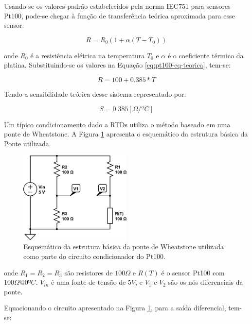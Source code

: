 \documentclass[a4paper]{instrumentacao}
\begin{document}
Usando-se os valores-padrão estabelecidos pela norma IEC751 para sensores Pt100, pode-se chegar à função de transferência teórica aproximada para esse sensor:

\begin{equation}
	R=R_0(1+\alpha(T-T_0))
	\label{eq:pt100-eq-teorica}
\end{equation}

\noindent onde $R_0$ é a resistência elétrica na temperatura $T_0$ e $\alpha$ é o coeficiente térmico da platina. Substituindo-se os valores na Equação \ref{eq:pt100-eq-teorica}, tem-se:

\begin{equation}
	R=100+0.385*T
	\label{eq:pt100-eq-teorica-valor}
\end{equation}

Tendo a sensibilidade teórica desse sistema representado por:

\begin{equation}
	S=0.385 [\Omega/ºC]
	\label{eq:pt100-sensibilidade-teorica-valor}
\end{equation}

Um típico condicionamento dado a RTDs utiliza o método baseado em uma ponte de Wheatstone. A Figura \ref{fig:termometro-ponte} apresenta o esquemático da estrutura básica da Ponte utilizada.

\begin{figure}[H]
	\centering \includegraphics[width=0.5\textwidth]{pt100-ponte.png}
	\caption{Esquemático da estrutura básica da ponte de Wheatstone utilizada como parte do circuito condicionador do Pt100.}
	\label{fig:termometro-ponte}
\end{figure}

\noindent onde $R_1=R_2=R_3$ são resistores de $100\Omega$ e $R(T)$ é o sensor Pt100 com $100\Omega@0ºC$. $V_{in}$ é uma fonte de tensão de $5V$, e $V_1$ e $V_2$ são os nós diferenciais da ponte.

Equacionando o circuito apresentado na Figura \ref{fig:termometro-ponte}, para a saída diferencial, tem-se:
\end{document}
